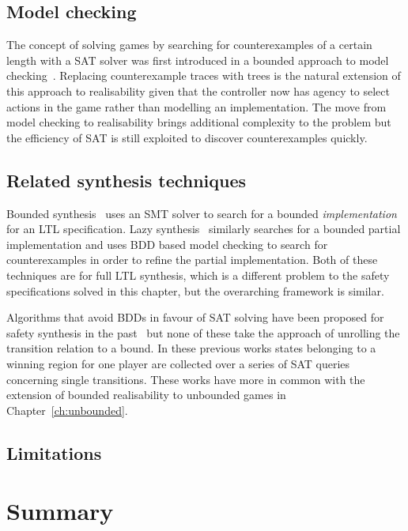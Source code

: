 \subsection{Model checking}

The concept of solving games by searching for counterexamples of a certain length with a SAT solver was first introduced in a bounded approach to model checking~\cite{Biere99}. Replacing counterexample traces with trees is the natural extension of this approach to realisability given that the controller now has agency to select actions in the game rather than modelling an implementation. The move from model checking to realisability brings additional complexity to the problem but the efficiency of SAT is still exploited to discover counterexamples quickly.

\subsection{Related synthesis techniques}

Bounded synthesis~\cite{Finkbeiner13} uses an SMT solver to search for a bounded \emph{implementation} for an LTL specification. Lazy synthesis~\cite{Finkbeiner12} similarly searches for a bounded partial implementation and uses BDD based model checking to search for counterexamples in order to refine the partial implementation. Both of these techniques are for full LTL synthesis, which is a different problem to the safety specifications solved in this chapter, but the overarching framework is similar. 

Algorithms that avoid BDDs in favour of SAT solving have been proposed for safety synthesis in the past~\cite{Morgenstern13,Chiang15,Bloem14} but none of these take the approach of unrolling the transition relation to a bound. In these previous works states belonging to a winning region for one player are collected over a series of SAT queries concerning single transitions. These works have more in common with the extension of bounded realisability to unbounded games in Chapter~\ref{ch:unbounded}.

\subsection{Limitations}



\section{Summary}

